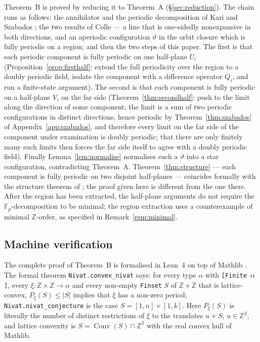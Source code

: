 \documentclass[11pt,reqno]{amsart}
\theoremstyle{plain}
\theoremstyle{definition}
\theoremstyle{remark}
\theoremstyle{plain}
\theoremstyle{remark}
\theoremstyle{definition}
\numberwithin{equation}{section}
\DeclareMathOperator{\Conv}{Conv}
\newcommand{\Z}{\mathbb{Z}}
\newcommand{\Fp}{\mathbb{F}_p}
\begin{document}
Theorem~B is proved by reducing it to Theorem~A (\S\ref{sec:reduction}).  The
chain runs as follows: the annihilator and the
periodic decomposition of Kari and Szabados \cite{KS}; the two results of Colle
\cite{Colle23a} — a line that is one-sidedly nonexpansive in both directions,
and an aperiodic configuration $\vartheta$ in the orbit closure which is fully
periodic on a region; and then the two steps of this paper.  The first is that
each periodic component is fully periodic on one half-plane $U_i$
(Proposition~\ref{prop:firsthalf}: extend the full periodicity over the region
to a doubly periodic field, isolate the component with a difference operator
$Q_i$, and run a finite-state argument).  The second is that each component is
fully periodic on a half-plane $V_i$ on the far side
(Theorem~\ref{thm:secondhalf}: push to the limit along the direction of some
component; the limit is a sum of two periodic configurations in distinct
directions, hence periodic by Theorem~\ref{thm:szabados} of
Appendix~\ref{app:szabados}, and therefore every limit on the far side of the
component under examination is doubly periodic; that there are only finitely
many such limits then forces the far side itself to agree with a doubly periodic
field).  Finally Lemma~\ref{lem:normalise} normalises such a $\vartheta$ into a
star configuration, contradicting Theorem~A.  Theorem~\ref{thm:structure} —
each component is fully periodic on two disjoint half-planes — coincides
formally with the structure theorem of \cite{CG}; the proof given here is
different from the one there.  After the region has been extracted, the
half-plane arguments do not require the $\Fp$-decomposition to be minimal;
the region extraction uses a counterexample of minimal $\Z$-order, as specified
in Remark~\ref{rem:minimal}.

\subsection*{Machine verification}

The complete proof of Theorem~B is formalised in Lean~4 \cite{Lean4} on top of
Mathlib \cite{Mathlib}.  The formal theorem \texttt{Nivat.convex\_nivat} says:
for every type $\alpha$ with \texttt{[Finite $\alpha$]}, every
$\xi\colon\Z\times\Z\to\alpha$ and every non-empty \texttt{Finset} $S$ of
$\Z\times\Z$ that is lattice-convex, $P_\xi(S)\le|S|$ implies that $\xi$ has a
non-zero period; \texttt{Nivat.nivat\_conjecture} is the case
$S=[1,n]\times[1,k]$.  Here $P_\xi(S)$ is literally the number of distinct
restrictions of $\xi$ to the translates $u+S$, $u\in\Z^2$, and lattice
convexity is $S=\Conv(S)\cap\Z^2$ with the real convex hull of Mathlib.
\end{document}
